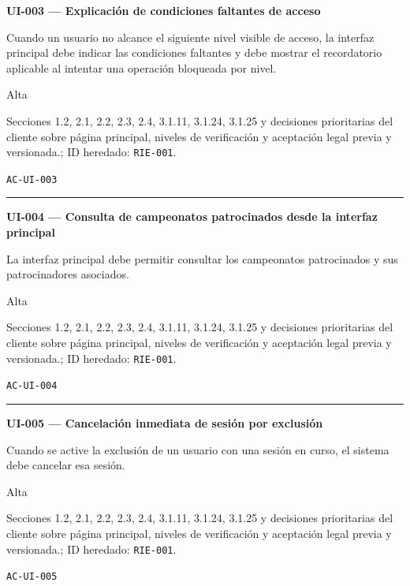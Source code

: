 \documentclass[10pt,letterpaper]{article}
\begin{document}
\noindent\textbf{UI-003 --- Explicación de condiciones faltantes de acceso}\par
\begin{description}[style=nextline,leftmargin=3.15cm,labelwidth=2.8cm,font=\normalfont\bfseries]
\item[Obligación] Cuando un usuario no alcance el siguiente nivel visible de acceso, la interfaz principal debe indicar las condiciones faltantes y debe mostrar el recordatorio aplicable al intentar una operación bloqueada por nivel.
\item[Prioridad] Alta
\item[Procedencia] Secciones 1.2, 2.1, 2.2, 2.3, 2.4, 3.1.11, 3.1.24, 3.1.25 y decisiones prioritarias del cliente sobre página principal, niveles de verificación y aceptación legal previa y versionada.; ID heredado: \texttt{RIE-001}.
\item[Verificación] \texttt{AC-UI-003}
\end{description}
\vspace{0.25em}\hrule\vspace{0.65em}
\noindent\textbf{UI-004 --- Consulta de campeonatos patrocinados desde la interfaz principal}\par
\begin{description}[style=nextline,leftmargin=3.15cm,labelwidth=2.8cm,font=\normalfont\bfseries]
\item[Obligación] La interfaz principal debe permitir consultar los campeonatos patrocinados y sus patrocinadores asociados.
\item[Prioridad] Alta
\item[Procedencia] Secciones 1.2, 2.1, 2.2, 2.3, 2.4, 3.1.11, 3.1.24, 3.1.25 y decisiones prioritarias del cliente sobre página principal, niveles de verificación y aceptación legal previa y versionada.; ID heredado: \texttt{RIE-001}.
\item[Verificación] \texttt{AC-UI-004}
\end{description}
\vspace{0.25em}\hrule\vspace{0.65em}
\noindent\textbf{UI-005 --- Cancelación inmediata de sesión por exclusión}\par
\begin{description}[style=nextline,leftmargin=3.15cm,labelwidth=2.8cm,font=\normalfont\bfseries]
\item[Obligación] Cuando se active la exclusión de un usuario con una sesión en curso, el sistema debe cancelar esa sesión.
\item[Prioridad] Alta
\item[Procedencia] Secciones 1.2, 2.1, 2.2, 2.3, 2.4, 3.1.11, 3.1.24, 3.1.25 y decisiones prioritarias del cliente sobre página principal, niveles de verificación y aceptación legal previa y versionada.; ID heredado: \texttt{RIE-001}.
\item[Verificación] \texttt{AC-UI-005}
\end{description}
\end{document}
